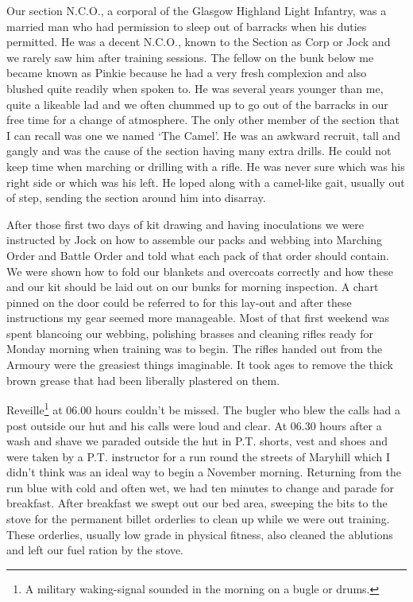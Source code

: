 Our section N.C.O., a corporal of the Glasgow Highland Light Infantry,
was a married man who had permission to sleep out of barracks when his
duties permitted. He was a decent N.C.O., known to the Section as
Corp or Jock and we rarely saw him after training sessions. The
fellow on the bunk below me became known as Pinkie because he had a
very fresh complexion and also blushed quite readily when spoken to.
He was several years younger than me, quite a likeable lad and we
often chummed up to go out of the barracks in our free time for a
change of atmosphere. The only other member of the section that I can
recall was one we named `The Camel'. He was an awkward recruit, tall
and gangly and was the cause of the section having many extra drills.
He could not keep time when marching or drilling with a rifle. He was
never sure which was his right side or which was his left. He loped
along with a camel-like gait, usually out of step, sending the section
around him into disarray.

After those first two days of kit drawing and having inoculations we
were instructed by \corporal Jock on how to assemble our packs and
webbing into Marching Order and Battle Order and told what each pack
of that order should contain. We were shown how to fold our blankets
and overcoats correctly and how these and our kit should be laid out
on our bunks for morning inspection. A chart pinned on the door could
be referred to for this lay-out and after these instructions my gear
seemed more manageable. Most of that first weekend was spent
blancoing our webbing, polishing brasses and cleaning rifles ready for
Monday morning when training was to begin. The rifles handed out from
the Armoury were the greasiest things imaginable. It took ages to
remove the thick brown grease that had been liberally plastered on
them.

Reveille\footnote{A military waking-signal sounded in the morning on a
bugle or drums.} at 06.00 hours couldn't be missed. The bugler who
blew the calls had a post outside our hut and his calls were loud and
clear.  At 06.30 hours after a wash and shave we paraded outside the
hut in P.T. shorts, vest and shoes and were taken by a P.T. instructor
for a run round the streets of Maryhill which I didn't think was an
ideal way to begin a November morning. Returning from the run blue
with cold and often wet, we had ten minutes to change and parade for
breakfast. After breakfast we swept out our bed area, sweeping the
bits to the stove for the permanent billet orderlies to clean up while
we were out training. These orderlies, usually low grade in physical
fitness, also cleaned the ablutions and left our fuel ration by the
stove.

